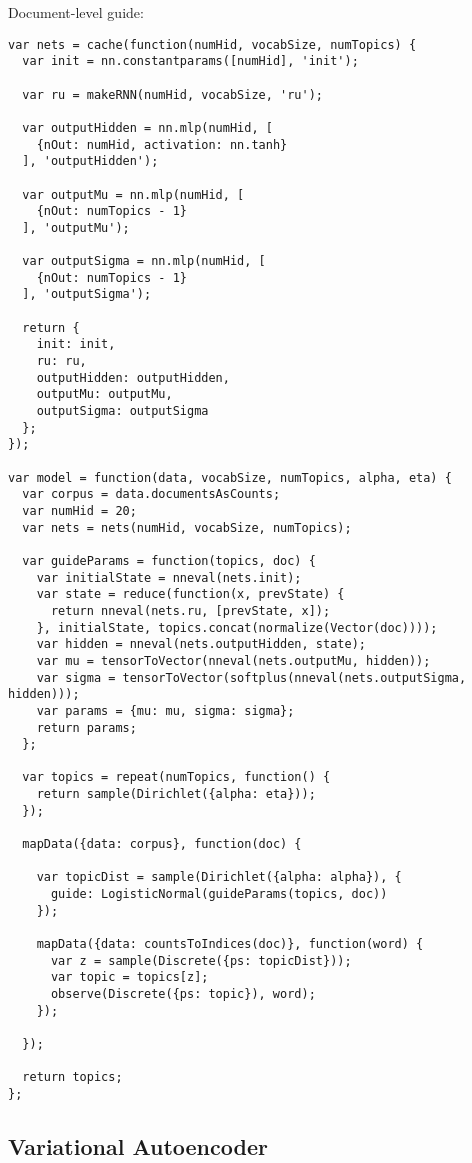 Document-level guide:
\begin{lstlisting}
var nets = cache(function(numHid, vocabSize, numTopics) {
  var init = nn.constantparams([numHid], 'init');

  var ru = makeRNN(numHid, vocabSize, 'ru');

  var outputHidden = nn.mlp(numHid, [
    {nOut: numHid, activation: nn.tanh}
  ], 'outputHidden');

  var outputMu = nn.mlp(numHid, [
    {nOut: numTopics - 1}
  ], 'outputMu');

  var outputSigma = nn.mlp(numHid, [
    {nOut: numTopics - 1}
  ], 'outputSigma');

  return {
    init: init,
    ru: ru,
    outputHidden: outputHidden,
    outputMu: outputMu,
    outputSigma: outputSigma
  };
});

var model = function(data, vocabSize, numTopics, alpha, eta) {
  var corpus = data.documentsAsCounts;
  var numHid = 20;
  var nets = nets(numHid, vocabSize, numTopics);

  var guideParams = function(topics, doc) {
    var initialState = nneval(nets.init);
    var state = reduce(function(x, prevState) {
      return nneval(nets.ru, [prevState, x]);
    }, initialState, topics.concat(normalize(Vector(doc))));
    var hidden = nneval(nets.outputHidden, state);
    var mu = tensorToVector(nneval(nets.outputMu, hidden));
    var sigma = tensorToVector(softplus(nneval(nets.outputSigma, hidden)));
    var params = {mu: mu, sigma: sigma};
    return params;
  };

  var topics = repeat(numTopics, function() {
    return sample(Dirichlet({alpha: eta}));
  });

  mapData({data: corpus}, function(doc) {

    var topicDist = sample(Dirichlet({alpha: alpha}), {
      guide: LogisticNormal(guideParams(topics, doc))
    });

    mapData({data: countsToIndices(doc)}, function(word) {
      var z = sample(Discrete({ps: topicDist}));
      var topic = topics[z];
      observe(Discrete({ps: topic}), word);
    });

  });

  return topics;
};
\end{lstlisting}


\subsection{Variational Autoencoder}
\label{sec:appendix_code:vae}

